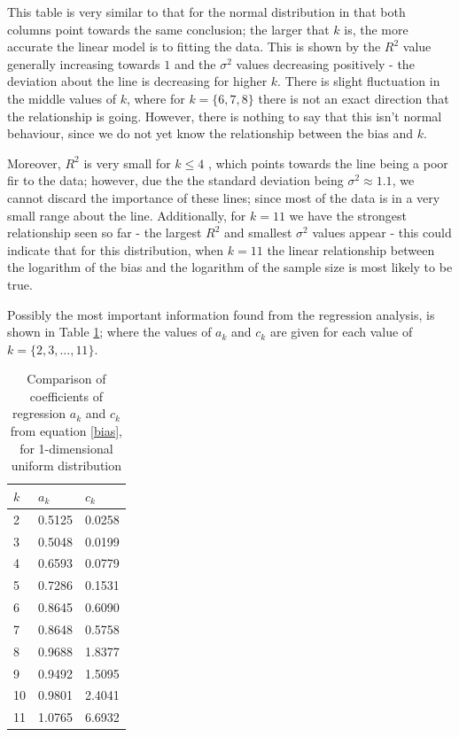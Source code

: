 \documentclass{report}
\begin{document}
This table is very similar to that for the normal distribution in that both columns point towards the same conclusion; the larger that $k$ is, the more accurate the linear model is to fitting the data. This is shown by the $R^2$ value generally increasing towards $1$ and the $\sigma^2$ values decreasing positively - the deviation about the line is decreasing for higher $k$. There is slight fluctuation in the middle values of $k$, where for $k = \{6, 7, 8\}$ there is not an exact direction that the relationship is going. However, there is nothing to say that this isn't normal behaviour, since we do not yet know the relationship between the bias and $k$.

Moreover, $R^2$ is very small for $k \leq 4$ , which points towards the line being a poor fir to the data; however, due the the standard deviation being $\sigma^2 \approx 1.1$, we cannot discard the importance of these lines; since most of the data is in a very small range about the line. Additionally, for $k=11$ we have the strongest relationship seen so far - the largest $R^2$ and smallest $\sigma^2$ values appear - this could indicate that for this distribution, when $k=11$ the linear relationship between the logarithm of the bias and the logarithm of the sample size is most likely to be true.

Possibly the most important information found from the regression analysis, is shown in Table \ref{uniform_a_c_compare_table}; where the values of $a_{k}$ and $c_{k}$ are given for each value of $k = \{ 2, 3, ..., 11\}$.

\begin{table}
\caption{Comparison of coefficients of regression $a_{k}$ and $c_{k}$ from equation \ref{bias}, for 1-dimensional uniform distribution} \label{uniform_a_c_compare_table}
\begin{center}
\begin{tabular}{| l | l l |} 
\toprule
$k$ &  $a_{k}$ & $c_{k}$ \\
\midrule[1pt]
2     & 0.5125    & 0.0258   \\
3     & 0.5048    & 0.0199   \\
4     & 0.6593    & 0.0779   \\
5     & 0.7286    & 0.1531   \\
6     & 0.8645    & 0.6090   \\
7     & 0.8648    & 0.5758   \\
8     & 0.9688    & 1.8377   \\
9     & 0.9492    & 1.5095   \\
10    & 0.9801    & 2.4041   \\
11    & 1.0765    & 6.6932   \\
\hline
\end{tabular}
\\[10pt]
\end{center}
\end{table}
\end{document}

